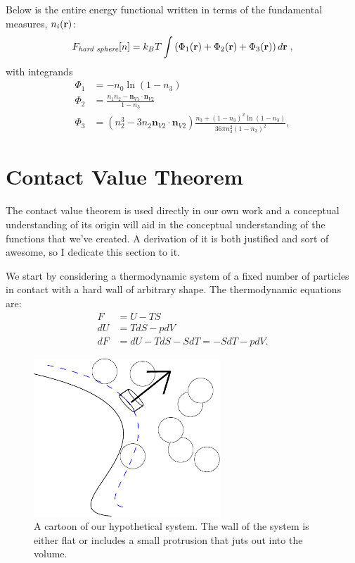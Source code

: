 Below is the entire energy functional written in terms of the
fundamental measures, $n_i(\textbf{r})$:
\begin{equation}
F_\textit{hard~sphere}[n] = k_B T \int \left(\Phi_1(\textbf{r}) + \Phi_2(\textbf{r}) + \Phi_3(\textbf{r})\right) d\textbf{r} \; ,
\end{equation}
with integrands
\begin{align}
\Phi_1 &= -n_0 \ln\left( 1 - n_3\right) \label{eq:Phi1}\\
\Phi_2 &= \frac{n_1 n_2 - \mathbf{n}_{V1} \cdot\mathbf{n}_{V2}}{1-n_3} \\
\Phi_3 &= (n_2^3 - 3 n_2 \mathbf{n}_{V2} \cdot \mathbf{n}_{V2}) \frac{
  n_3 + (1-n_3)^2 \ln(1-n_3)
}{
  36\pi n_3^2\left( 1 - n_3 \right)^2
} , \label{eq:Phi3}
\end{align}

\clearpage
\newpage

\section{Contact Value Theorem}

The contact value theorem is used directly in our own work and a
conceptual understanding of its origin will aid in the conceptual
understanding of the functions that we've created.  A derivation of it
is both justified and sort of awesome, so I dedicate this section to
it.

We start by considering a thermodynamic system of a fixed number of
particles in contact with a hard wall of arbitrary shape.  The
thermodynamic equations are:
\begin{align}
F &= U - TS \\
dU &= TdS -pdV \\
dF &= dU - TdS - SdT = -SdT - pdV.
\end{align}

\begin{figure}
\begin{center}
\includegraphics[width=7cm]{contact_one}
\end{center}
\caption{A cartoon of our hypothetical system.  The wall of the system
   is either flat or includes a small protrusion that juts out into
   the volume.}
\label{fig:contact}
\end{figure}

